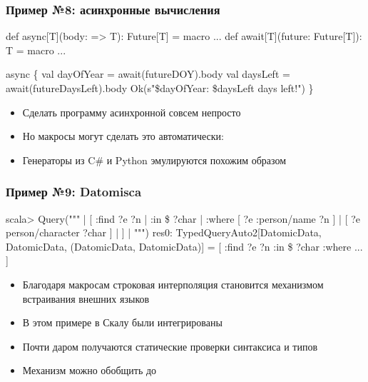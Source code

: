 \documentclass[svgnames,hyperref={bookmarks=false},11pt]{beamer}
\begin{document}
\begin{frame}[fragile, t]
\frametitle{Пример №8: асинхронные вычисления}

\begin{semiverbatim}
\alert{def async[T](body: => T): Future[T] = macro ...}
\alert{def await[T](future: Future[T]): T = macro ...}

\alert{async \{}
  val dayOfYear = \alert{await(}futureDOY\alert{)}.body
  val daysLeft = \alert{await(}futureDaysLeft\alert{)}.body
  Ok(s"\$dayOfYear: \$daysLeft days left!")
\alert{\}}



\end{semiverbatim}

\begin{itemize}
\item Сделать программу асинхронной совсем непросто
\item Но макросы могут сделать это автоматически: 
\item Генераторы из C\# и Python эмулируются похожим образом
\end{itemize}
\end{frame}

\begin{frame}[fragile, t]
\frametitle{Пример №9: Datomisca}
\begin{semiverbatim}
scala> \alert{Query(}"""
|      [ :find ?e ?n
|        :in \$ ?char
|        :where  [ ?e :person/name ?n ]
|                [ ?e person/character ?char ]
|      ]
|      """\alert{)}
res0: TypedQueryAuto2[DatomicData, DatomicData, (DatomicData,
DatomicData)] = [ :find ?e ?n :in \$ ?char :where ... ]

\end{semiverbatim}

\begin{itemize}
\item Благодаря макросам строковая интерполяция становится механизмом встраивания внешних языков
\item В этом примере в Скалу были интегрированы 
\item Почти даром получаются статические проверки синтаксиса и типов
\item Механизм можно обобщить до 
\end{itemize}
\end{frame}
\end{document}
